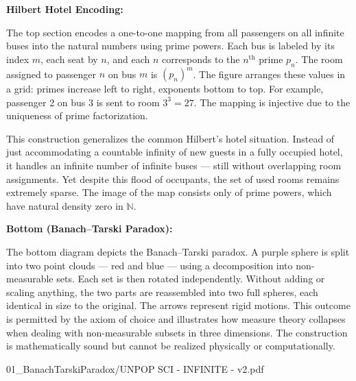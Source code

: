 \begin{SideNotePage}{
  \textbf{Hilbert Hotel Encoding:} \par
  The top section encodes a one-to-one mapping from all passengers on all infinite buses into the natural numbers using prime powers. Each bus is labeled by its index $m$, each seat by $n$, and each $n$ corresponds to the $n^\text{th}$ prime $p_n$. The room assigned to passenger $n$ on bus $m$ is $(p_n)^m$. The figure arranges these values in a grid: primes increase left to right, exponents bottom to top. For example, passenger 2 on bus 3 is sent to room $3^3 = 27$. The mapping is injective due to the uniqueness of prime factorization.

  \vspace{0.5em}
  This construction generalizes the common Hilbert’s hotel situation. Instead of just accommodating a countable infinity of new guests in a fully occupied hotel, it handles an infinite number of infinite buses — still without overlapping room assignments. Yet despite this flood of occupants, the set of used rooms remains extremely sparse. The image of the map consists only of prime powers, which have natural density zero in $\mathbb{N}$.
  
  \vspace{1.5em}
  \textbf{Bottom (Banach–Tarski Paradox):} \par
  The bottom diagram depicts the Banach–Tarski paradox. A purple sphere is split into two point clouds — red and blue — using a decomposition into non-measurable sets. Each set is then rotated independently. Without adding or scaling anything, the two parts are reassembled into two full spheres, each identical in size to the original. The arrows represent rigid motions. This outcome is permitted by the axiom of choice and illustrates how measure theory collapses when dealing with non-measurable subsets in three dimensions. The construction is mathematically sound but cannot be realized physically or computationally.
}{01_BanachTarskiParadox/UNPOP SCI - INFINITE - v2.pdf}
\end{SideNotePage}

